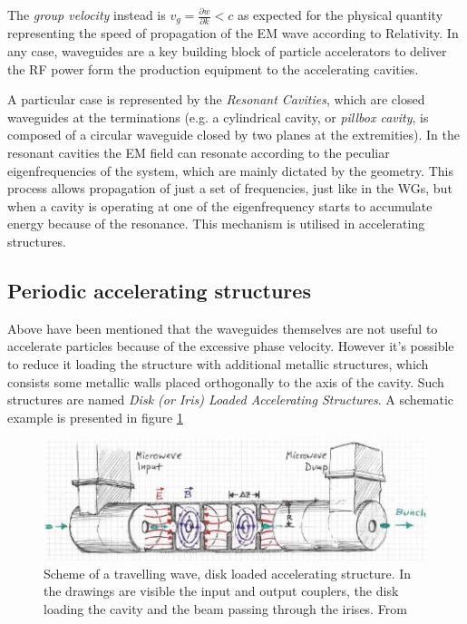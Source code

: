 The \textit{group velocity} instead is $v_g = \frac{\partial w}{\partial k} < c$ as expected for the physical quantity representing the speed of propagation of the EM wave according to Relativity. 
In any case, waveguides are a key building block of particle accelerators to deliver the RF power form the production equipment to the accelerating cavities.

A particular case is represented by the \textit{Resonant Cavities}, which are closed waveguides at the terminations (e.g. a cylindrical cavity, or \textit{pillbox cavity}, is composed of a circular waveguide closed by two planes at the extremities). In the resonant cavities the EM field can resonate according to the peculiar eigenfrequencies of the system, which are mainly dictated by the geometry. This process allows propagation of just a set of frequencies, just like in the WGs, but when a cavity is operating at one of the eigenfrequency starts to accumulate energy because of the resonance. This mechanism is utilised in accelerating structures.


\subsection[Periodic accelerating structures]{Periodic accelerating structures}

Above have been mentioned that the waveguides themselves are not useful to accelerate particles because of the excessive phase velocity. However it's possible to reduce it loading the structure with additional metallic structures, which consists some metallic walls placed orthogonally to the axis of the cavity.  Such structures are named \textit{Disk (or Iris) Loaded Accelerating Structures}. A schematic example is presented in figure \ref{ACS_scheme}

\begin{figure}[h]
\centering

\includegraphics[scale=0.45]{pictures/scheme_ACS}
\caption{Scheme of a travelling wave, disk loaded accelerating structure. In the drawings are visible the input and output couplers, the disk loading the cavity and the beam passing through the irises. From \cite{streun}}
\label{ACS_scheme}

\end{figure}


